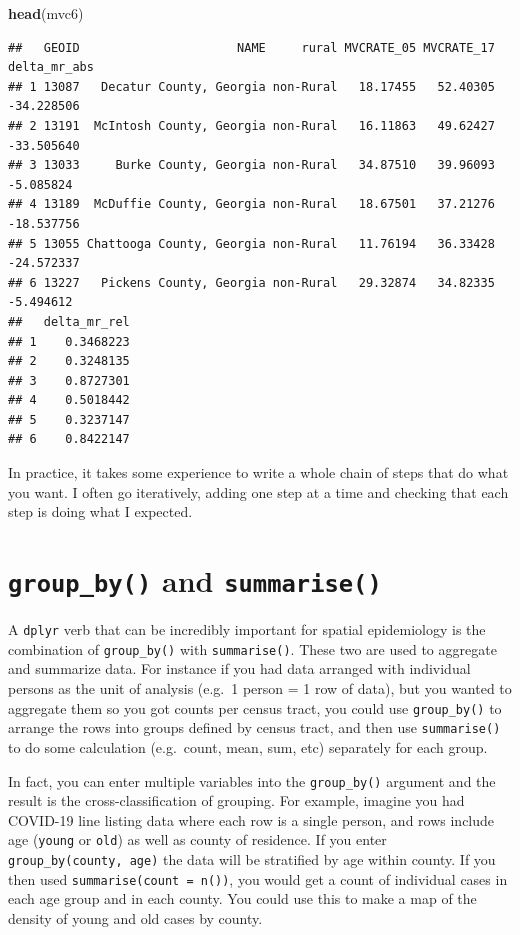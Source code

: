 \documentclass[
]{book}
\newenvironment{Shaded}{\begin{snugshade}}{\end{snugshade}}
\newcommand{\FunctionTok}[1]{\textcolor[rgb]{0.13,0.29,0.53}{\textbf{#1}}}
\newcommand{\NormalTok}[1]{#1}
\begin{document}
\begin{Shaded}
\begin{Highlighting}[]
\FunctionTok{head}\NormalTok{(mvc6)}
\end{Highlighting}
\end{Shaded}

\begin{verbatim}
##   GEOID                      NAME     rural MVCRATE_05 MVCRATE_17 delta_mr_abs
## 1 13087   Decatur County, Georgia non-Rural   18.17455   52.40305   -34.228506
## 2 13191  McIntosh County, Georgia non-Rural   16.11863   49.62427   -33.505640
## 3 13033     Burke County, Georgia non-Rural   34.87510   39.96093    -5.085824
## 4 13189  McDuffie County, Georgia non-Rural   18.67501   37.21276   -18.537756
## 5 13055 Chattooga County, Georgia non-Rural   11.76194   36.33428   -24.572337
## 6 13227   Pickens County, Georgia non-Rural   29.32874   34.82335    -5.494612
##   delta_mr_rel
## 1    0.3468223
## 2    0.3248135
## 3    0.8727301
## 4    0.5018442
## 5    0.3237147
## 6    0.8422147
\end{verbatim}

In practice, it takes some experience to write a whole chain of steps that do what you want. I often go iteratively, adding one step at a time and checking that each step is doing what I expected.

\hypertarget{group_by-and-summarise}{%
\section{\texorpdfstring{\texttt{group\_by()} and \texttt{summarise()}}{group\_by() and summarise()}}\label{group_by-and-summarise}}

A \texttt{dplyr} verb that can be incredibly important for spatial epidemiology is the combination of \texttt{group\_by()} with \texttt{summarise()}. These two are used to aggregate and summarize data. For instance if you had data arranged with individual persons as the unit of analysis (e.g.~1 person = 1 row of data), but you wanted to aggregate them so you got counts per census tract, you could use \texttt{group\_by()} to arrange the rows into groups defined by census tract, and then use \texttt{summarise()} to do some calculation (e.g.~count, mean, sum, etc) separately for each group.

In fact, you can enter multiple variables into the \texttt{group\_by()} argument and the result is the cross-classification of grouping. For example, imagine you had COVID-19 line listing data where each row is a single person, and rows include age (\texttt{young} or \texttt{old}) as well as county of residence. If you enter \texttt{group\_by(county,\ age)} the data will be stratified by age within county. If you then used \texttt{summarise(count\ =\ n())}, you would get a count of individual cases in each age group and in each county. You could use this to make a map of the density of young and old cases by county.
\end{document}
